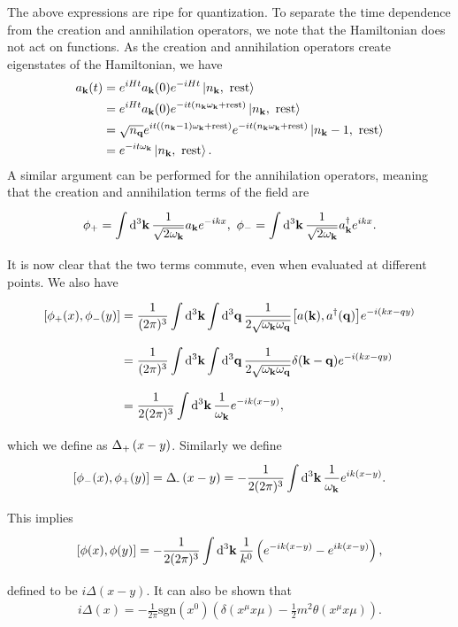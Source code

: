 The above expressions are ripe for quantization. To separate the time dependence from the creation and annihilation operators, we note that the Hamiltonian does not act on functions. As the creation and annihilation operators create eigenstates of the Hamiltonian, we have
\begin{align*}
	a_{\vb{k}}(t) &= e^{iHt}a_{\vb{k}}(0)e^{-iHt}\ket{n_{\vb{k}},\ \text{rest}} \\
	              &= e^{iHt}a_{\vb{k}}(0)e^{-it(n_{\vb{k}}\omega_{\vb{k}} + \text{rest})}\ket{n_{\vb{k}},\ \text{rest}} \\
	              &= \sqrt{n_{\vb{q}}}e^{it((n_{\vb{k}} - 1)\omega_{\vb{k}} + \text{rest})}e^{-it(n_{\vb{k}}\omega_{\vb{k}} + \text{rest})}\ket{n_{\vb{k}} - 1,\ \text{rest}} \\
	              &= e^{-it\omega_{\vb{k}}}\ket{n_{\vb{k}},\ \text{rest}}.
\end{align*}
A similar argument can be performed for the annihilation operators, meaning that the creation and annihilation terms of the field are
\begin{align*}
	\phi_{+} = \integ[3]{}{}{\vb{k}}{\frac{1}{\sqrt{2\omega_{\vb{k}}}}a_{\vb{k}}e^{-ikx}},\ \phi_{-} = \integ[3]{}{}{\vb{k}}{\frac{1}{\sqrt{2\omega_{\vb{k}}}}a\adj_{\vb{k}}e^{ikx}}.
\end{align*}
It is now clear that the two terms commute, even when evaluated at different points. We also have
\begin{align*}
	\comm{\phi_{+}(x)}{\phi_{-}(y)} &= \frac{1}{(2\pi)^{3}}\integ[3]{}{}{\vb{k}}{\integ[3]{}{}{\vb{q}}{\frac{1}{2\sqrt{\omega_{\vb{k}}\omega_{\vb{q}}}}\comm{a(\vb{k})}{a\adj(\vb{q})}e^{-i(kx - qy)}}} \\
	                                &= \frac{1}{(2\pi)^{3}}\integ[3]{}{}{\vb{k}}{\integ[3]{}{}{\vb{q}}{\frac{1}{2\sqrt{\omega_{\vb{k}}\omega_{\vb{q}}}}\delta(\vb{k} - \vb{q})e^{-i(kx - qy)}}} \\
	                                &= \frac{1}{2(2\pi)^{3}}\integ[3]{}{}{\vb{k}}{\frac{1}{\omega_{\vb{k}}}e^{-ik(x - y)}},
\end{align*}
which we define as $\Delta_{\text{+}}\left(x - y\right)$. Similarly we define
\begin{align*}
	\comm{\phi_{-}(x)}{\phi_{+}(y)} = \kgprop{-}{x - y} = -\frac{1}{2(2\pi)^{3}}\integ[3]{}{}{\vb{k}}{\frac{1}{\omega_{\vb{k}}}e^{ik(x - y)}}.
\end{align*}
This implies
\begin{align*}
	\comm{\phi(x)}{\phi(y)} = -\frac{1}{2(2\pi)^{3}}\integ[3]{}{}{\vb{k}}{\frac{1}{k^{0}}\left(e^{-ik(x - y)} - e^{ik(x - y)}\right)},
\end{align*}
defined to be $i\Delta(x - y)$. It can also be shown that
\begin{align*}
	i\Delta(x) = -\frac{1}{2\pi}\text{sgn}(x^{0})(\delta(x^{\mu}x{\mu}) - \frac{1}{2}m^{2}\theta(x^{\mu}x{\mu})).
\end{align*}


